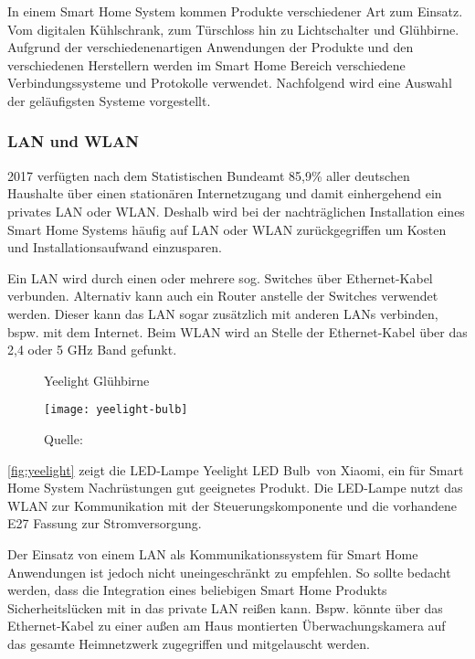 In einem Smart Home System kommen Produkte verschiedener Art zum Einsatz.
Vom digitalen Kühlschrank, zum Türschloss hin zu Lichtschalter und Glühbirne.
Aufgrund der verschiedenenartigen Anwendungen der Produkte und den verschiedenen Herstellern werden im Smart Home Bereich verschiedene Verbindungssysteme und Protokolle verwendet.
Nachfolgend wird eine Auswahl der geläufigsten Systeme vorgestellt.

\subsubsection{LAN und WLAN}

2017 verfügten nach dem Statistischen Bundeamt 85,9\% aller deutschen Haushalte über einen stationären Internetzugang und damit einhergehend ein privates \ac{LAN} oder \ac{WLAN}.
Deshalb wird bei der nachträglichen Installation eines Smart Home Systems häufig auf \ac{LAN} oder \ac{WLAN} zurückgegriffen um Kosten und Installationsaufwand einzusparen.

Ein \ac{LAN} wird durch einen oder mehrere sog. Switches über Ethernet-Kabel verbunden.
Alternativ kann auch ein Router anstelle der Switches verwendet werden.
Dieser kann das \ac{LAN} sogar zusätzlich mit anderen \acp{LAN} verbinden, bspw. mit dem Internet.
Beim \ac{WLAN} wird an Stelle der Ethernet-Kabel über das 2,4 oder 5 GHz Band gefunkt.

\begin{wrapfigure}{r}{0.35\textwidth}
	\centering
	\caption{Yeelight Glühbirne}
	\texttt{[image: yeelight-bulb]}
	\caption*{\footnotesize{Quelle: }}
	\label{fig:yeelight}
\end{wrapfigure}

\autoref{fig:yeelight} zeigt die LED-Lampe \glqq Yeelight LED Bulb\grqq \ von Xiaomi, ein für Smart Home System Nachrüstungen gut geeignetes Produkt.
Die LED-Lampe nutzt das \ac{WLAN} zur Kommunikation mit der Steuerungskomponente und die vorhandene E27 Fassung zur Stromversorgung.

Der Einsatz von einem \ac{LAN} als Kommunikationssystem für Smart Home Anwendungen ist jedoch nicht uneingeschränkt zu empfehlen.
So sollte bedacht werden, dass die Integration eines beliebigen Smart Home Produkts Sicherheitslücken mit in das private \ac{LAN} reißen kann.
Bspw. könnte über das Ethernet-Kabel zu einer außen am Haus montierten Überwachungskamera auf das gesamte Heimnetzwerk zugegriffen und mitgelauscht werden.


